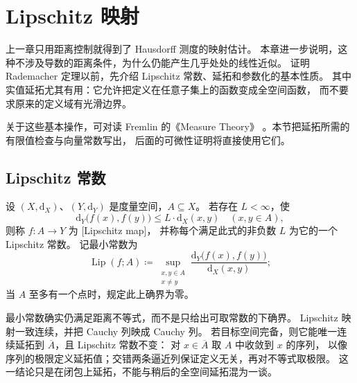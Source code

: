 \section{Lipschitz 映射}
\label{b1:sec:1601}

上一章只用距离控制就得到了 Hausdorff 测度的映射估计。
本章进一步说明，这种不涉及导数的距离条件，为什么仍能产生几乎处处的线性近似。
证明 Rademacher 定理以前，先介绍 Lipschitz 常数、延拓和参数化的基本性质。
其中实值延拓尤其有用：它允许把定义在任意子集上的函数变成全空间函数，
而不要求原来的定义域有光滑边界。

\ProseParagraphBreak

关于这些基本操作，可对读 Fremlin 的《Measure Theory》%
\cite[\S262]{Fremlin2016Measure}。本节把延拓所需的有限值检查与向量常数写出，
后面的可微性证明将直接使用它们。

\subsection{Lipschitz 常数}
\label{b1:subsec:160101}

\begin{definition}\label{b1:def:lipschitz-map}
设 \((X,\mathrm{d}_X)\)、\((Y,\mathrm{d}_Y)\) 是度量空间，\(A\subseteq X\)。
若存在 \(L<\infty\)，使
\[
 \mathrm{d}_Y\bigl(f(x),f(y)\bigr)\leq L\cdot \mathrm{d}_X(x,y)
 \quad(x,y\in A),
\]
则称 \(f:A\rightarrow Y\) 为 [Lipschitz map]，
并称每个满足此式的非负数 \(L\) 为它的一个 Lipschitz 常数。
记最小常数为
\[
 \operatorname{Lip}(f;A)
 \coloneqq\sup_{\substack{x,y\in A\\x\ne y}}
   \frac{\mathrm{d}_Y\bigl(f(x),f(y)\bigr)}{\mathrm{d}_X(x,y)};
\]
当 \(A\) 至多有一个点时，规定此上确界为零。
\end{definition}

最小常数确实仍满足距离不等式，而不是只给出可取常数的下确界。
Lipschitz 映射一致连续，并把 Cauchy 列映成 Cauchy 列。
若目标空间完备，则它能唯一连续延拓到 \(\overline A\)，且 Lipschitz 常数不变：
对 \(x\in\overline A\) 取 \(A\) 中收敛到 \(x\) 的序列，
以像序列的极限定义延拓值；交错两条逼近列保证定义无关，再对不等式取极限。
这一结论只是在闭包上延拓，不能与稍后的全空间延拓混为一谈。

